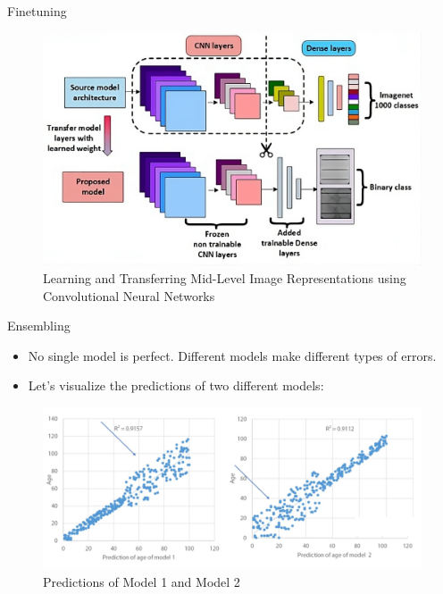 \documentclass[10pt]{beamer}
\theoremstyle{remark}
\theoremstyle{definition}
\begin{document}
\begin{frame}{Finetuning}
    \begin{figure}
    \centering
    \includegraphics[width=1.0\textwidth,height=1.0\textheight,keepaspectratio]{./images/Finetuning_fig.png}
    \caption{Learning and Transferring Mid-Level Image Representations using Convolutional Neural Networks }
    \end{figure}

\end{frame}

\begin{frame}{Ensembling}
\begin{itemize}
    \item No single model is perfect. Different models make different types of errors.
    \item Let’s visualize the predictions of two different models:
\end{itemize}

\begin{figure}
    \centering
    \includegraphics[width=1.0\linewidth]{./images/ensembling1.png} 
    \caption{Predictions of Model 1 and Model 2}
\end{figure}
\end{frame}
\end{document}
